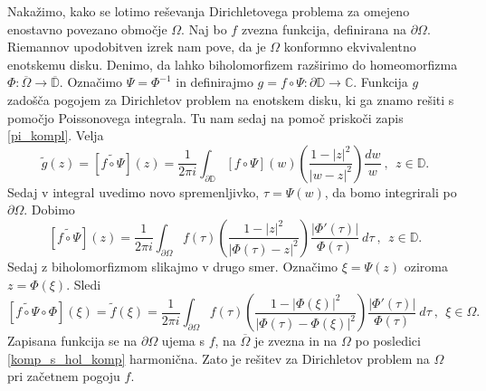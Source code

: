 \documentclass[mat1, tisk]{fmfdelo}
\begin{document}
    Nakažimo, kako se lotimo reševanja Dirichletovega problema za omejeno enostavno povezano območje $\Omega$. Naj bo $f$ zvezna funkcija, definirana na $\partial \Omega$. 
    Riemannov upodobitven izrek nam pove, da je $\Omega$ konformno ekvivalentno enotskemu disku. 
    Denimo, da lahko biholomorfizem razširimo do homeomorfizma $\Phi: \overline{\Omega} \to \overline{\mathbb{D}}$. 
    Označimo $\Psi = \Phi^{-1}$ in definirajmo $g = f \circ \Psi: \partial \mathbb{D} \to \mathbb{C}$. Funkcija $g$ zadošča pogojem za Dirichletov problem na enotskem disku, ki ga znamo rešiti s pomočjo Poissonovega integrala. 
    Tu nam sedaj na pomoč priskoči zapis \eqref{pi_kompl}. Velja
    $$
    \widetilde{g}(z) = [\widetilde{f \circ \Psi}](z) = \frac{1}{2\pi i}\int_{\partial \mathbb{D}}{[f \circ \Psi](w) \left(\frac{1 - |z|^2}{|w - z|^2}\right)\frac{dw}{w}}~,~~z \in \mathbb{D}. 
    $$
    Sedaj v integral uvedimo novo spremenljivko, $\tau = \Psi(w)$, da bomo integrirali po $\partial \Omega$. Dobimo
    $$
    [\widetilde{f \circ \Psi}](z) = \frac{1}{2\pi i}\int_{\partial \Omega}{f(\tau) \left(\frac{1 - |z|^2}{|\Phi(\tau) - z|^2}\right)\frac{|\Phi'(\tau)|}{\Phi(\tau)}~d \tau}~,~~z \in \mathbb{D}. 
    $$
    Sedaj z biholomorfizmom slikajmo v drugo smer. Označimo $\xi = \Psi(z)$ oziroma $z = \Phi(\xi)$. Sledi
    \begin{equation}
        \label{eno_pov_obm}
        [\widetilde{f \circ \Psi} \circ \Phi](\xi) = \widetilde{f}(\xi) = \frac{1}{2\pi i}\int_{\partial \Omega}{f(\tau) \left(\frac{1 - |\Phi(\xi)|^2}{|\Phi(\tau) - \Phi(\xi)|^2}\right)\frac{|\Phi'(\tau)|}{\Phi(\tau)}~d \tau}~,~~\xi \in \Omega. 
    \end{equation}
    Zapisana funkcija se na $\partial \Omega$ ujema s $f$, na $\overline{\Omega}$ je zvezna in na $\Omega$ po posledici \ref{komp_s_hol_komp} harmonična. Zato je rešitev za Dirichletov problem na $\Omega$ pri začetnem pogoju $f$.
\end{document}
